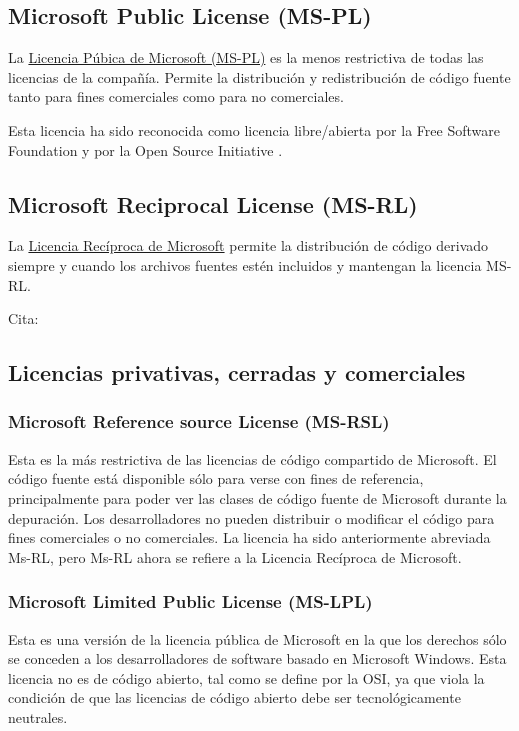 \documentclass[10pt, titlepage]{article}
\begin{document}
\subsection{Microsoft Public License (MS-PL)}
La \href{https://opensource.org/licenses/MS-PL}{Licencia Púbica de Microsoft (MS-PL)} \cite{microsoft_public_license_mspl} es la menos restrictiva de todas las licencias de la compañía. Permite la distribución y redistribución de código fuente tanto para fines comerciales como para no comerciales.

Esta licencia ha sido reconocida como licencia libre/abierta por la Free Software Foundation y por la Open Source Initiative \cite{desde_linux_2020}.

\subsection{Microsoft Reciprocal License (MS-RL)}
La \href{https://opensource.org/licenses/MS-RL}{Licencia Recíproca de Microsoft} permite la distribución de código derivado siempre y cuando los archivos fuentes estén incluidos y mantengan la licencia MS-RL.

Cita: \cite{microsoft_reciprocal_license_msrl}
\subsection{Licencias privativas, cerradas y comerciales}
\subsubsection{Microsoft Reference source License (MS-RSL)}
Esta es la más restrictiva de las licencias de código compartido de Microsoft. El código fuente está disponible sólo para verse con fines de referencia, principalmente para poder ver las clases de código fuente de Microsoft durante la depuración. Los desarrolladores no pueden distribuir o modificar el código para fines comerciales o no comerciales. La licencia ha sido anteriormente abreviada Ms-RL, pero Ms-RL ahora se refiere a la Licencia Recíproca de Microsoft.
\subsubsection{Microsoft Limited Public License (MS-LPL)}
Esta es una versión de la licencia pública de Microsoft en la que los derechos sólo se conceden a los desarrolladores de software basado en Microsoft Windows. Esta licencia no es de código abierto, tal como se define por la OSI, ya que viola la condición de que las licencias de código abierto debe ser tecnológicamente neutrales.
\end{document}
